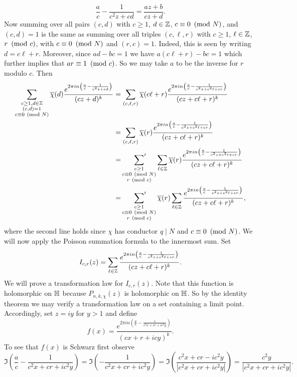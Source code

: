     \[
      \frac{a}{c}-\frac{1}{c^{2}z+cd} = \frac{az+b}{cz+d}.
    \]
    Now summing over all pairs $(c,d)$ with $c \ge 1$, $d \in \mathbb{Z}$, $c \equiv 0 \ \left(\text{mod }N\right)$, and $(c,d) = 1$ is the same as summing over all triples $(c,\ell,r)$ with $c \ge 1$, $\ell \in \mathbb{Z}$, $r \ \left(\text{mod }c\right)$, with $c \equiv 0 \ \left(\text{mod }N\right)$ and $(r,c) = 1$. Indeed, this is seen by writing $d = c\ell+r$. Moreover, since $ad-bc = 1$ we have $a(c\ell+r)-bc = 1$ which further implies that $ar \equiv 1 \ \left(\text{mod }c\right)$. So we may take $a$ to be the inverse for $r$ modulo $c$. Then
    \begin{align*}
      \sum_{\substack{c \ge 1,d \in \mathbb{Z} \\ (c,d) = 1 \\ c \equiv 0 \ \left(\text{mod }N\right)}}\overline{\chi}(d)\frac{e^{2\pi in\left(\frac{a}{c}-\frac{1}{c^{2}z+cd}\right)}}{(cz+d)^{k}} &= \sum_{(c,\ell,r)}\overline{\chi}(c\ell+r)\frac{e^{2\pi in\left(\frac{a}{c}-\frac{1}{c^{2}z+c^{2}\ell+cr}\right)}}{(cz+c\ell+r)^{k}} \\
      &= \sum_{(c,\ell,r)}\overline{\chi}(r)\frac{e^{2\pi in\left(\frac{a}{c}-\frac{1}{c^{2}z+c^{2}\ell+cr}\right)}}{(cz+c\ell+r)^{k}} \\
      &= \sideset{}{'}\sum_{\substack{c \ge 1 \\ c \equiv 0 \ \left(\text{mod }N\right) \\ r \ \left(\text{mod }c\right)}}\sum_{\ell \in \mathbb{Z}}\overline{\chi}(r)\frac{e^{2\pi in\left(\frac{a}{c}-\frac{1}{c^{2}z+c^{2}\ell+cr}\right)}}{(cz+c\ell+r)^{k}} \\
      &= \sideset{}{'}\sum_{\substack{c \ge 1 \\ c \equiv 0 \ \left(\text{mod }N\right) \\ r \ \left(\text{mod }c\right)}}\overline{\chi}(r)\sum_{\ell \in \mathbb{Z}}\frac{e^{2\pi in\left(\frac{a}{c}-\frac{1}{c^{2}z+c^{2}\ell+cr}\right)}}{(cz+c\ell+r)^{k}},
    \end{align*}
    where the second line holds since $\chi$ has conductor $q \mid N$ and $c \equiv 0 \ \left(\text{mod }N\right)$. We will now apply the Poisson summation formula to the innermost sum. Set
    \[
      I_{c,r}(z) = \sum_{\ell \in \mathbb{Z}}\frac{e^{2\pi in\left(\frac{a}{c}-\frac{1}{c^{2}z+c^{2}\ell+cr}\right)}}{(cz+c\ell+r)^{k}}.
    \]
    We will prove a transformation law for $I_{c,r}(z)$. Note that this function is holomorphic on $\mathbb{H}$ because $P_{n,k,\chi}(z)$ is holomorphic on $\mathbb{H}$. So by the identity theorem we may verify a transformation law on a set containing a limit point. Accordingly, set $z = iy$ for $y > 1$ and define
    \[
      f(x) = \frac{e^{2\pi in\left(\frac{a}{c}-\frac{1}{c^{2}x+cr+ic^{2}y}\right)}}{(cx+r+icy)^{k}}.
    \]
    To see that $f(x)$ is Schwarz first observe
    \[
      \Im\left(\frac{a}{c}-\frac{1}{c^{2}x+cr+ic^{2}y}\right) = \Im\left(-\frac{1}{c^{2}x+cr+ic^{2}y}\right) = \Im\left(\frac{c^{2}x+cr-ic^{2}y}{|c^{2}x+cr+ic^{2}y|}\right) = \frac{c^{2}y}{|c^{2}x+cr+ic^{2}y|}.
    \]
